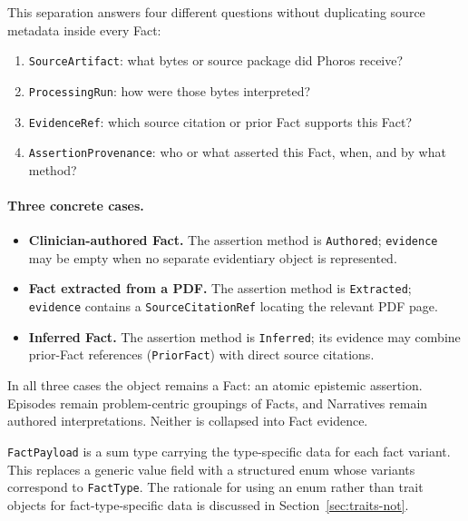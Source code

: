 \documentclass[11pt]{article}
\begin{document}
This separation answers four different questions without duplicating source
metadata inside every Fact:

\begin{enumerate}
\item \texttt{SourceArtifact}: what bytes or source package did Phoros receive?
\item \texttt{ProcessingRun}: how were those bytes interpreted?
\item \texttt{EvidenceRef}: which source citation or prior Fact supports this Fact?
\item \texttt{AssertionProvenance}: who or what asserted this Fact, when, and by what method?
\end{enumerate}

\paragraph{Three concrete cases.}
\begin{itemize}
\item \textbf{Clinician-authored Fact.} The assertion method is \texttt{Authored};
  \texttt{evidence} may be empty when no separate evidentiary object is represented.
\item \textbf{Fact extracted from a PDF.} The assertion method is \texttt{Extracted};
  \texttt{evidence} contains a \texttt{SourceCitationRef} locating the relevant PDF page.
\item \textbf{Inferred Fact.} The assertion method is \texttt{Inferred};
  its evidence may combine prior-Fact references (\texttt{PriorFact}) with
  direct source citations.
\end{itemize}

In all three cases the object remains a Fact: an atomic epistemic assertion.
Episodes remain problem-centric groupings of Facts, and Narratives remain
authored interpretations. Neither is collapsed into Fact evidence.



\texttt{FactPayload} is a sum type carrying the type-specific data for each
fact variant. This replaces a generic value field with a structured enum
whose variants correspond to \texttt{FactType}. The rationale for using an
enum rather than trait objects for fact-type-specific data is discussed in
Section~\ref{sec:traits-not}.
\end{document}
